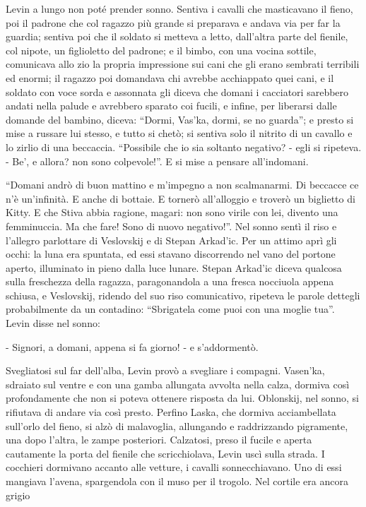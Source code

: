 Levin a lungo non poté prender sonno. Sentiva i cavalli che masticavano il fieno, poi il padrone che col ragazzo più grande si preparava e andava via per far la guardia; sentiva poi che il soldato si metteva a letto, dall'altra parte del fienile, col nipote, un figlioletto del padrone; e il bimbo, con una vocina sottile, comunicava allo zio la propria impressione sui cani che gli erano sembrati terribili ed enormi; il ragazzo poi domandava chi avrebbe acchiappato quei cani, e il soldato con voce sorda e assonnata gli diceva che domani i cacciatori sarebbero andati nella palude e avrebbero sparato coi fucili, e infine, per liberarsi dalle domande del bambino, diceva: ``Dormi, Vas'ka, dormi, se no guarda''; e presto si mise a russare lui stesso, e tutto si chetò; si sentiva solo il nitrito di un cavallo e lo zirlio di una beccaccia. ``Possibile che io sia soltanto negativo? - egli si ripeteva. - Be', e allora? non sono colpevole!''. E si mise a pensare all'indomani. 

``Domani andrò di buon mattino e m'impegno a non scalmanarmi. Di beccacce ce n'è un'infinità. E anche di bottaie. E tornerò all'alloggio e troverò un biglietto di Kitty. E che Stiva abbia ragione, magari: non sono virile con lei, divento una femminuccia. Ma che fare! Sono di nuovo negativo!''. Nel sonno sentì il riso e l'allegro parlottare di Veslovskij e di Stepan Arkad'ic. Per un attimo aprì gli occhi: la luna era spuntata, ed essi stavano discorrendo nel vano del portone aperto, illuminato in pieno dalla luce lunare. Stepan Arkad'ic diceva qualcosa sulla freschezza della ragazza, paragonandola a una fresca nocciuola appena schiusa, e Veslovskij, ridendo del suo riso comunicativo, ripeteva le parole dettegli probabilmente da un contadino: ``Sbrigatela come puoi con una moglie tua''. Levin disse nel sonno: 

- Signori, a domani, appena si fa giorno! - e s'addormentò. 

Svegliatosi sul far dell'alba, Levin provò a svegliare i compagni. Vasen'ka, sdraiato sul ventre e con una gamba allungata avvolta nella calza, dormiva così profondamente che non si poteva ottenere risposta da lui. Oblonskij, nel sonno, si rifiutava di andare via così presto. Perfino Laska, che dormiva acciambellata sull'orlo del fieno, si alzò di malavoglia, allungando e raddrizzando pigramente, una dopo l'altra, le zampe posteriori. Calzatosi, preso il fucile e aperta cautamente la porta del fienile che scricchiolava, Levin uscì sulla strada. I cocchieri dormivano accanto alle vetture, i cavalli sonnecchiavano. Uno di essi mangiava l'avena, spargendola con il muso per il trogolo. Nel cortile era ancora grigio 

